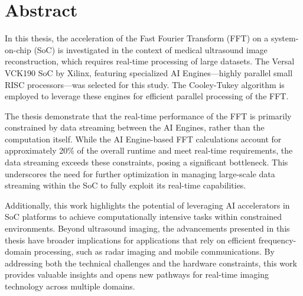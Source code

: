 \documentclass[a4paper,english,numbers=noenddot,bibtotoc,BCOR=1.5cm,headsepline,DIV=12,appendixprefix,final,openany]{scrbook}
\begin{document}
\chapter*{Abstract}
\begin{center}
    \vspace*{\fill}
        \begin{flushleft}
            In this thesis, the acceleration of the Fast Fourier Transform (FFT) on a system-on-chip (SoC) is investigated in the context of medical ultrasound image reconstruction, which requires real-time processing of large datasets. The Versal VCK190 SoC by Xilinx, featuring specialized AI Engines—highly parallel small RISC processors—was selected for this study. The Cooley-Tukey algorithm is employed to leverage these engines for efficient parallel processing of the FFT.\par
            The thesis demonstrate that the real-time performance of the FFT is primarily constrained by data streaming between the AI Engines, rather than the computation itself. While the AI Engine-based FFT calculations account for approximately 20\% of the overall runtime and meet real-time requirements, the data streaming exceeds these constraints, posing a significant bottleneck. This underscores the need for further optimization in managing large-scale data streaming within the SoC to fully exploit its real-time capabilities.\par
            Additionally, this work highlights the potential of leveraging AI accelerators in SoC platforms to achieve computationally intensive tasks within constrained environments. Beyond ultrasound imaging, the advancements presented in this thesis have broader implications for applications that rely on efficient frequency-domain processing, such as radar imaging and mobile communications. By addressing both the technical challenges and the hardware constraints, this work provides valuable insights and opens new pathways for real-time imaging technology across multiple domains.

        \end{flushleft}
    \vspace*{\fill}
\end{center}

\mainmatter








\listoffigures
\listoftables






\end{document}
